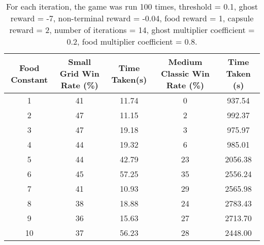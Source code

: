 \documentclass[12pt]{report}
\begin{document}
              \begin{table}[H]
                \begin{center}
                  \begin{adjustbox}{max width=\textwidth}
                    \begin{tabular}{*{5}{c}}
                      \textbf{Food Constant} & \textbf{Small Grid Win Rate (\%)} & \textbf{Time Taken(s)} & \textbf{Medium Classic Win Rate (\%)} & \textbf{Time Taken (s)}\\
                    \hline
                          1 & 41 & 11.74 & 0 & 937.54 \\
                          2 & 47 & 11.15 & 2 & 992.37 \\
                          3 & 47 & 19.18 & 3 & 975.97 \\
                          4 & 44 & 19.32 & 6 & 985.01 \\
                          5 & 44 & 42.79 & 23 & 2056.38 \\
                          6 & 45 & 57.25 & 35 & 2556.24 \\
                          7 & 41 & 10.93 & 29 & 2565.98 \\
                          8 & 38 & 18.88 & 24 & 2783.43 \\
                          9 & 36 & 15.63 & 27 & 2713.70 \\
                          10 & 37 & 56.23 & 28 & 2448.00 \\

                  \end{tabular}
                  \end{adjustbox}
                  \caption{For each iteration, the game was run 100 times, threshold = 0.1, ghost reward = -7, non-terminal reward = -0.04, food reward = 1, capsule reward = 2, number of iterations = 14, ghost multiplier coefficient = 0.2, food multiplier coefficient = 0.8.}
                  \label{tab:table4}
                \end{center}
              \end{table}
\end{document}
